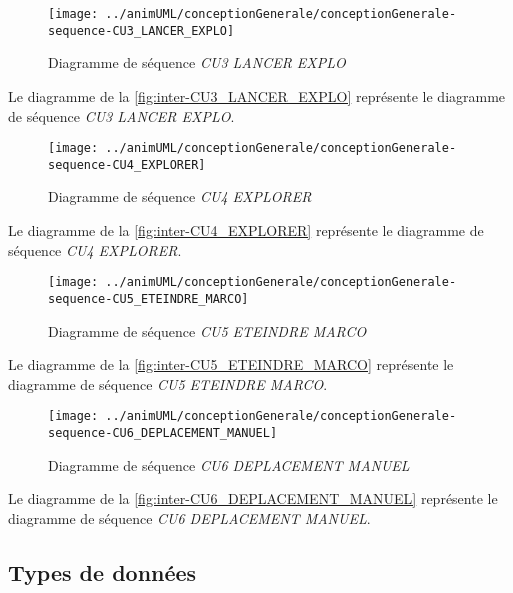 \begin{figure}[H]
	\centering
	\texttt{[image: ../animUML/conceptionGenerale/conceptionGenerale-sequence-CU3\_LANCER\_EXPLO]}
	\caption{Diagramme de séquence \emph{CU3 LANCER EXPLO}}
	\label{fig:inter-CU3_LANCER_EXPLO}
\end{figure}
Le diagramme de la \autoref{fig:inter-CU3_LANCER_EXPLO} représente le diagramme de séquence \emph{CU3 LANCER EXPLO}.


\begin{figure}[H]
	\centering
	\texttt{[image: ../animUML/conceptionGenerale/conceptionGenerale-sequence-CU4\_EXPLORER]}
	\caption{Diagramme de séquence \emph{CU4 EXPLORER}}
	\label{fig:inter-CU4_EXPLORER}
\end{figure}
Le diagramme de la \autoref{fig:inter-CU4_EXPLORER} représente le diagramme de séquence \emph{CU4 EXPLORER}.


\begin{figure}[H]
	\centering
	\texttt{[image: ../animUML/conceptionGenerale/conceptionGenerale-sequence-CU5\_ETEINDRE\_MARCO]}
	\caption{Diagramme de séquence \emph{CU5 ETEINDRE MARCO}}
	\label{fig:inter-CU5_ETEINDRE_MARCO}
\end{figure}
Le diagramme de la \autoref{fig:inter-CU5_ETEINDRE_MARCO} représente le diagramme de séquence \emph{CU5 ETEINDRE MARCO}.


\begin{figure}[H]
	\centering
	\texttt{[image: ../animUML/conceptionGenerale/conceptionGenerale-sequence-CU6\_DEPLACEMENT\_MANUEL]}
	\caption{Diagramme de séquence \emph{CU6 DEPLACEMENT MANUEL}}
	\label{fig:inter-CU6_DEPLACEMENT_MANUEL}
\end{figure}
Le diagramme de la \autoref{fig:inter-CU6_DEPLACEMENT_MANUEL} représente le diagramme de séquence \emph{CU6 DEPLACEMENT MANUEL}.



\subsection{Types de données}

